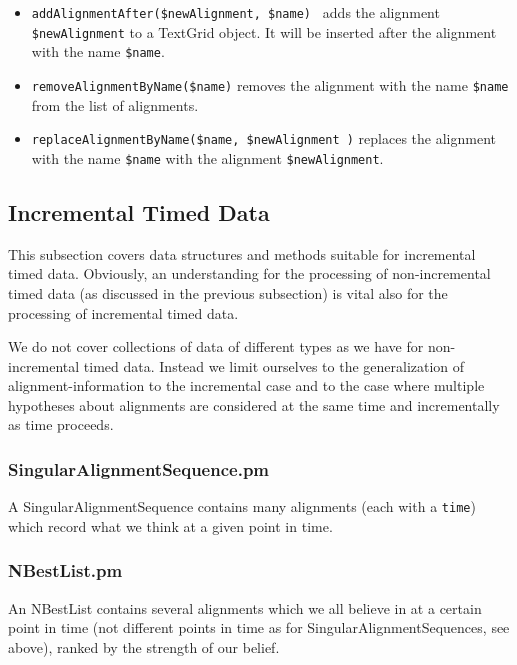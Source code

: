 \documentclass[a4,twoside=off,draft=true]{scrartcl}
\begin{document}
\begin{itemize}
\item {\tt addAlignmentAfter(\$newAlignment, \$name) } adds the alignment {\tt \$newAlignment} to a TextGrid object. It will be inserted after the alignment with the name {\tt \$name}.
 
\item {\tt removeAlignmentByName(\$name)} removes the alignment with the name  {\tt \$name} from the list of alignments. 

\item {\tt replaceAlignmentByName(\$name, \$newAlignment )} replaces the alignment with the name {\tt \$name} with the alignment {\tt \$newAlignment}. 

\end{itemize}


\subsection{Incremental Timed Data}

This subsection covers data structures and methods suitable for incremental timed data. 
Obviously, an understanding for the processing of non-incremental timed data (as discussed in the
previous subsection) is vital also for the processing of incremental timed data.

We do not cover collections of data of different types as we have for non-incremental timed data.
Instead we limit ourselves to the generalization of alignment-information to the incremental case
and to the case where multiple hypotheses about alignments are considered at the same time and 
incrementally as time proceeds.

\subsubsection{SingularAlignmentSequence.pm}

A SingularAlignmentSequence contains many alignments (each with a {\tt time}) 
which record what we think at a given point in time.

\subsubsection{NBestList.pm}

An NBestList contains several alignments which we all believe in at a certain 
point in time (not different points in time as for SingularAlignmentSequences, 
see above), ranked by the strength of our belief.
\end{document}
